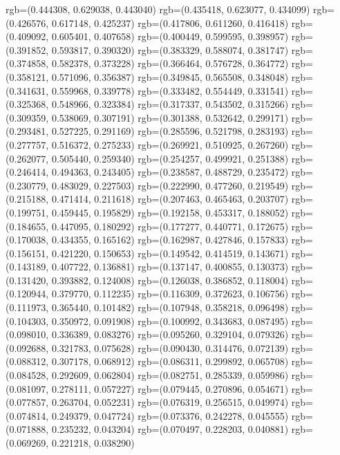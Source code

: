 {{{					rgb=(0.444308, 0.629038, 0.443040)
					rgb=(0.435418, 0.623077, 0.434099)
					rgb=(0.426576, 0.617148, 0.425237)
					rgb=(0.417806, 0.611260, 0.416418)
					rgb=(0.409092, 0.605401, 0.407658)
					rgb=(0.400449, 0.599595, 0.398957)
					rgb=(0.391852, 0.593817, 0.390320)
					rgb=(0.383329, 0.588074, 0.381747)
					rgb=(0.374858, 0.582378, 0.373228)
					rgb=(0.366464, 0.576728, 0.364772)
					rgb=(0.358121, 0.571096, 0.356387)
					rgb=(0.349845, 0.565508, 0.348048)
					rgb=(0.341631, 0.559968, 0.339778)
					rgb=(0.333482, 0.554449, 0.331541)
					rgb=(0.325368, 0.548966, 0.323384)
					rgb=(0.317337, 0.543502, 0.315266)
					rgb=(0.309359, 0.538069, 0.307191)
					rgb=(0.301388, 0.532642, 0.299171)
					rgb=(0.293481, 0.527225, 0.291169)
					rgb=(0.285596, 0.521798, 0.283193)
					rgb=(0.277757, 0.516372, 0.275233)
					rgb=(0.269921, 0.510925, 0.267260)
					rgb=(0.262077, 0.505440, 0.259340)
					rgb=(0.254257, 0.499921, 0.251388)
					rgb=(0.246414, 0.494363, 0.243405)
					rgb=(0.238587, 0.488729, 0.235472)
					rgb=(0.230779, 0.483029, 0.227503)
					rgb=(0.222990, 0.477260, 0.219549)
					rgb=(0.215188, 0.471414, 0.211618)
					rgb=(0.207463, 0.465463, 0.203707)
					rgb=(0.199751, 0.459445, 0.195829)
					rgb=(0.192158, 0.453317, 0.188052)
					rgb=(0.184655, 0.447095, 0.180292)
					rgb=(0.177277, 0.440771, 0.172675)
					rgb=(0.170038, 0.434355, 0.165162)
					rgb=(0.162987, 0.427846, 0.157833)
					rgb=(0.156151, 0.421220, 0.150653)
					rgb=(0.149542, 0.414519, 0.143671)
					rgb=(0.143189, 0.407722, 0.136881)
					rgb=(0.137147, 0.400855, 0.130373)
					rgb=(0.131420, 0.393882, 0.124008)
					rgb=(0.126038, 0.386852, 0.118004)
					rgb=(0.120944, 0.379770, 0.112235)
					rgb=(0.116309, 0.372623, 0.106756)
					rgb=(0.111973, 0.365440, 0.101482)
					rgb=(0.107948, 0.358218, 0.096498)
					rgb=(0.104303, 0.350972, 0.091908)
					rgb=(0.100992, 0.343683, 0.087495)
					rgb=(0.098010, 0.336389, 0.083276)
					rgb=(0.095260, 0.329104, 0.079326)
					rgb=(0.092688, 0.321783, 0.075628)
					rgb=(0.090430, 0.314476, 0.072139)
					rgb=(0.088312, 0.307178, 0.068912)
					rgb=(0.086311, 0.299892, 0.065708)
					rgb=(0.084528, 0.292609, 0.062804)
					rgb=(0.082751, 0.285339, 0.059986)
					rgb=(0.081097, 0.278111, 0.057227)
					rgb=(0.079445, 0.270896, 0.054671)
					rgb=(0.077857, 0.263704, 0.052231)
					rgb=(0.076319, 0.256515, 0.049974)
					rgb=(0.074814, 0.249379, 0.047724)
					rgb=(0.073376, 0.242278, 0.045555)
					rgb=(0.071888, 0.235232, 0.043204)
					rgb=(0.070497, 0.228203, 0.040881)
					rgb=(0.069269, 0.221218, 0.038290)
}}}
